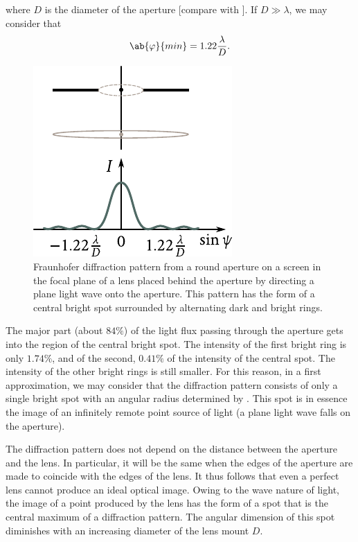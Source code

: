 \noindent
where $D$ is the diameter of the aperture [compare with ].
If $D\gg\lambda$, we may consider that
\begin{equation}\label{eq:18_66}
	\ab{\varphi}{min} = 1.22 \frac{\lambda}{D}.
\end{equation}

\begin{figure}[t]
	\begin{center}
		\includegraphics[scale=1.0]{figures/ch_18/fig_18_47.pdf}
        \caption[]{Fraunhofer diffraction pattern from a round aperture on a screen in the focal plane of a lens placed behind the aperture by directing a plane light wave onto the aperture. This pattern has the form of a central bright spot surrounded by alternating dark and bright rings.}
		\label{fig:18_47}
	\end{center}
	\vspace{-0.8cm}
\end{figure}

The major part (about $84\%$) of the light flux passing through the aperture gets into the region of the central bright spot.
The intensity of the first bright ring is only
$1.74\%$, and of the second, $0.41\%$ of the intensity of the central spot.
The intensity of the other bright rings is still
smaller.
For this reason, in a first approximation, we may consider that the diffraction pattern consists of only a single bright spot with an angular radius determined by .
This spot is in essence the image of an infinitely remote point source of light (a plane light wave falls on the aperture).

The diffraction pattern does not depend on the distance between the aperture and the lens.
In particular, it will be the same when the edges of the aperture are made to coincide with the edges of the lens.
It thus follows that even a perfect lens cannot produce an ideal optical image.
Owing to the wave nature of light, the image of a point produced by the lens has the form of a spot that is the central maximum of a diffraction pattern.
The angular dimension of this spot diminishes with an increasing diameter of the lens mount $D$.

